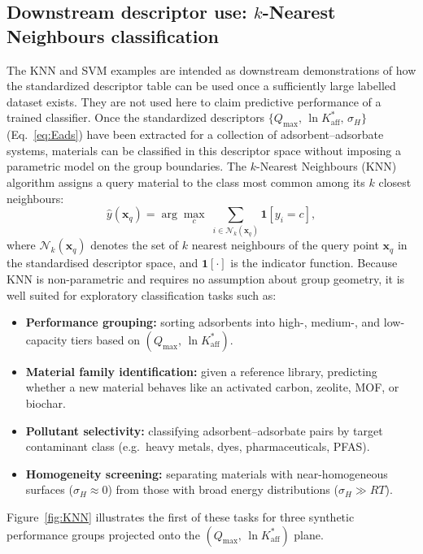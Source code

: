 \documentclass[journal=jacsat,manuscript=article]{achemso}
\begin{document}
	\subsection{Downstream descriptor use: $k$-Nearest Neighbours classification}
	\label{sec:KNN}

	
The KNN and SVM examples are intended as downstream demonstrations of how the standardized descriptor table can be used once a sufficiently large labelled dataset exists. They are not used here to claim predictive performance of a trained classifier.
Once the standardized descriptors $\{Q_{\max},\, \ln K_{\mathrm{aff}}^{\ast},\, \sigma_H\}$ (Eq.~\eqref{eq:Eads}) have been extracted for a collection of adsorbent--adsorbate systems, materials can be classified in this descriptor space without imposing a parametric model on the group boundaries. The $k$-Nearest Neighbours (KNN) algorithm assigns a query material to the class most common among its $k$ closest neighbours:
	\begin{equation}
		\hat{y}(\mathbf{x}_q)
		= \arg\max_{c}\;
		\sum_{i \in \mathcal{N}_k(\mathbf{x}_q)} \mathbf{1}[y_i = c],
		\label{eq:KNN}
	\end{equation}
	where $\mathcal{N}_k(\mathbf{x}_q)$ denotes the set of $k$ nearest neighbours of the query point $\mathbf{x}_q$ in the standardised descriptor space, and $\mathbf{1}[\cdot]$ is the indicator function. Because KNN is non-parametric and requires no assumption about group geometry, it is well suited for exploratory classification tasks such as:
	\begin{itemize}
		\item \textbf{Performance grouping:} sorting adsorbents into high-, medium-, and low-capacity tiers based on $(Q_{\max},\, \ln K_{\mathrm{aff}}^{\ast})$.
		\item \textbf{Material family identification:} given a reference library, predicting whether a new material behaves like an activated carbon, zeolite, MOF, or biochar.
		\item \textbf{Pollutant selectivity:} classifying adsorbent--adsorbate pairs by target contaminant class (e.g.\ heavy metals, dyes, pharmaceuticals, PFAS).
		\item \textbf{Homogeneity screening:} separating materials with near-homogeneous surfaces ($\sigma_H \approx 0$) from those with broad energy distributions ($\sigma_H \gg RT$).
	\end{itemize}
	Figure~\ref{fig:KNN} illustrates the first of these tasks for three synthetic performance groups projected onto the $(Q_{\max},\, \ln K_{\mathrm{aff}}^{\ast})$ plane.
\end{document}
